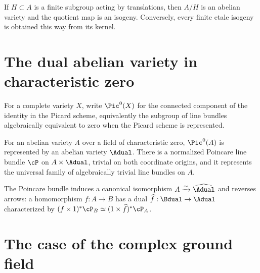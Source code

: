 \begin{proposition}
\label{mumford-prop-translation-quotient-isogeny}
If $H\subset A$ is a finite subgroup acting by translations, then $A/H$ is an
abelian variety and the quotient map is an isogeny.  Conversely, every finite
etale isogeny is obtained this way from its kernel.
\notready
\end{proposition}

\section{The dual abelian variety in characteristic zero}
\label{mumford-II8}

\begin{definition}
\label{mumford-def-piczero}
For a complete variety $X$, write $\Pic^0(X)$ for the connected component of
the identity in the Picard scheme, equivalently the subgroup of line bundles
algebraically equivalent to zero when the Picard scheme is represented.
\notready
\end{definition}

\begin{theorem}
\label{mumford-thm-dual-char-zero}
For an abelian variety $A$ over a field of characteristic zero, $\Pic^0(A)$ is
represented by an abelian variety $\Adual$.  There is a normalized Poincare line
bundle $\cP$ on $A\times\Adual$, trivial on both coordinate origins, and it
represents the universal family of algebraically trivial line bundles on $A$.
\notready
\end{theorem}

\begin{proposition}
\label{mumford-prop-biduality-char-zero}
The Poincare bundle induces a canonical isomorphism $A\xrightarrow{\sim}
\widehat{\Adual}$ and reverses arrows: a homomorphism $f:A\to B$ has a
dual $\widehat f:\Bdual\to\Adual$ characterized by
$(f\times1)^*\cP_B\simeq(1\times\widehat f)^*\cP_A$.
\notready
\end{proposition}

\section{The case of the complex ground field}
\label{mumford-II9}

